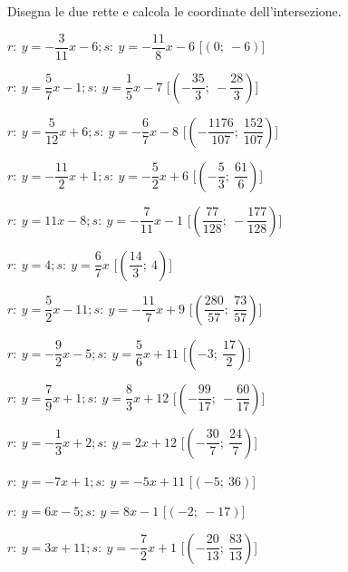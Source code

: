 \begin{esercizio}\label{ese:}
 Disegna le due rette e calcola le coordinate dell'intersezione.
 \begin{enumeratea}
  \item  $r:~y = -\dfrac{3}{11} x -6; s:~y = -\dfrac{11}{8} x -6$ \hfill 
   [$\left(0;~-6\right)$]
  \item  $r:~y = \dfrac{5}{7} x -1; s:~y = \dfrac{1}{5} x -7$ \hfill 
   [$\left(-\dfrac{35}{3};~-\dfrac{28}{3}\right)$]
  \item  $r:~y = \dfrac{5}{12} x +6; s:~y = -\dfrac{6}{7} x -8$ \hfill 
   [$\left(-\dfrac{1176}{107};~\dfrac{152}{107}\right)$]
  \item  $r:~y = -\dfrac{11}{2} x +1; s:~y = -\dfrac{5}{2} x +6$ \hfill 
   [$\left(-\dfrac{5}{3};~\dfrac{61}{6}\right)$]
  \item  $r:~y = 11 x -8; s:~y = -\dfrac{7}{11} x -1$ \hfill 
   [$\left(\dfrac{77}{128};~-\dfrac{177}{128}\right)$]
  \item  $r:~y = 4; s:~y = \dfrac{6}{7} x $ \hfill 
   [$\left(\dfrac{14}{3};~4\right)$]
  \item  $r:~y = \dfrac{5}{2} x -11; s:~y = -\dfrac{11}{7} x +9$ \hfill 
   [$\left(\dfrac{280}{57};~\dfrac{73}{57}\right)$]
  \item  $r:~y = -\dfrac{9}{2} x -5; s:~y = \dfrac{5}{6} x +11$ \hfill 
   [$\left(-3;~\dfrac{17}{2}\right)$]
  \item  $r:~y = \dfrac{7}{9} x +1; s:~y = \dfrac{8}{3} x +12$ \hfill 
   [$\left(-\dfrac{99}{17};~-\dfrac{60}{17}\right)$]
  \item  $r:~y = -\dfrac{1}{3} x +2; s:~y = 2 x +12$ \hfill 
   [$\left(-\dfrac{30}{7};~\dfrac{24}{7}\right)$]
  \item  $r:~y = -7 x +1; s:~y = -5 x +11$ \hfill 
   [$\left(-5;~36\right)$]
  \item  $r:~y = 6 x -5; s:~y = 8 x -1$ \hfill 
   [$\left(-2;~-17\right)$]
  \item  $r:~y = 3 x +11; s:~y = -\dfrac{7}{2} x +1$ \hfill 
   [$\left(-\dfrac{20}{13};~\dfrac{83}{13}\right)$]
 \end{enumeratea}
\end{esercizio}

